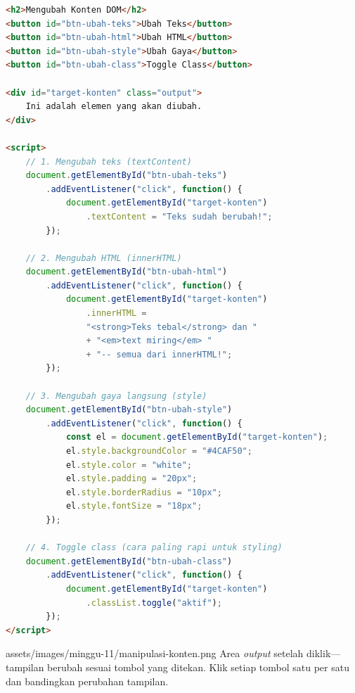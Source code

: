 \begin{lstlisting}[language=HTML, caption={Empat cara mengubah konten DOM}, label={lst:11-manipulasi-konten}]
<h2>Mengubah Konten DOM</h2>
<button id="btn-ubah-teks">Ubah Teks</button>
<button id="btn-ubah-html">Ubah HTML</button>
<button id="btn-ubah-style">Ubah Gaya</button>
<button id="btn-ubah-class">Toggle Class</button>

<div id="target-konten" class="output">
    Ini adalah elemen yang akan diubah.
</div>

<script>
    // 1. Mengubah teks (textContent)
    document.getElementById("btn-ubah-teks")
        .addEventListener("click", function() {
            document.getElementById("target-konten")
                .textContent = "Teks sudah berubah!";
        });

    // 2. Mengubah HTML (innerHTML)
    document.getElementById("btn-ubah-html")
        .addEventListener("click", function() {
            document.getElementById("target-konten")
                .innerHTML =
                "<strong>Teks tebal</strong> dan "
                + "<em>text miring</em> "
                + "-- semua dari innerHTML!";
        });

    // 3. Mengubah gaya langsung (style)
    document.getElementById("btn-ubah-style")
        .addEventListener("click", function() {
            const el = document.getElementById("target-konten");
            el.style.backgroundColor = "#4CAF50";
            el.style.color = "white";
            el.style.padding = "20px";
            el.style.borderRadius = "10px";
            el.style.fontSize = "18px";
        });

    // 4. Toggle class (cara paling rapi untuk styling)
    document.getElementById("btn-ubah-class")
        .addEventListener("click", function() {
            document.getElementById("target-konten")
                .classList.toggle("aktif");
        });
</script>
\end{lstlisting}

\begin{tangkapanlayar}
  {assets/images/minggu-11/manipulasi-konten.png}
  {Area \emph{output} setelah diklik---tampilan berubah sesuai tombol yang ditekan.}
  {Klik setiap tombol satu per satu dan bandingkan perubahan tampilan.}
\end{tangkapanlayar}

